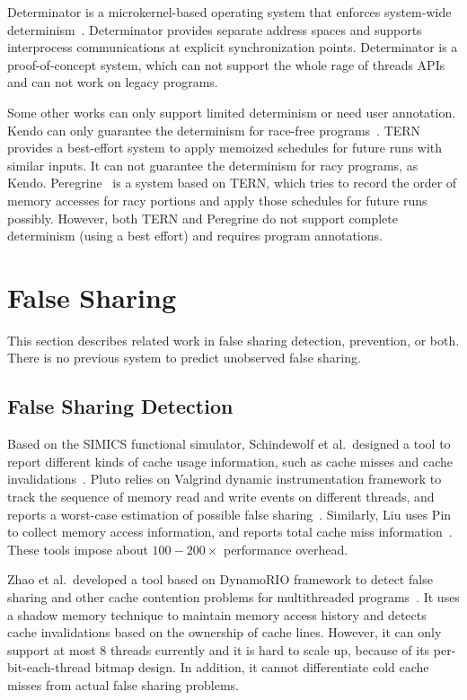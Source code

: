 Determinator is a microkernel-based operating system that enforces system-wide determinism~\cite{efficient-system-enforced}. Determinator provides separate address spaces and supports interprocess
communications at explicit synchronization points. 
Determinator is a proof-of-concept system, which can not support the whole rage of
threads APIs and can not work on legacy programs.  

Some other works can only support limited determinism or need user annotation.
Kendo can only guarantee the determinism for race-free programs~\cite{1508256}. 
TERN~\cite{stable-deterministic} provides a best-effort system to apply memoized schedules for future runs with similar inputs. 
It can not guarantee the determinism for racy programs, as Kendo. 
Peregrine~\cite{peregrine:sosp11} is a system based on TERN, which tries to record the order of memory accesses for racy portions and apply those schedules for future runs possibly.
However, both TERN and Peregrine do not support complete determinism (using a best effort) and requires program annotations. 

\section{False Sharing}

This section describes related work in false sharing detection, prevention, or both. There is no previous
system to predict unobserved false sharing.

\subsection{False Sharing Detection}
Based on the SIMICS functional simulator, Schindewolf et al.\ designed a tool to report different kinds of cache usage information, such as cache misses and cache invalidations~\cite{falseshare:simulator}. Pluto relies on Valgrind dynamic instrumentation framework to track the sequence of memory read and write events on different threads, and reports a worst-case estimation of possible false sharing~\cite{falseshare:binaryinstrumentation1}.
Similarly, Liu uses Pin to collect memory access information, and reports total cache miss information~\cite{falseshare:binaryinstrumentation2}.
These tools impose about $100-200\times$ performance overhead.

Zhao et al.\ developed a tool based on DynamoRIO framework to detect false sharing and other cache contention problems
for multithreaded programs~\cite{qinzhao}. 
It uses a shadow memory technique to maintain memory access history and detects cache invalidations based on the ownership of cache lines. However, it can only support at most $8$ threads currently and it is hard to scale up, because of its per-bit-each-thread bitmap design. In addition, it cannot differentiate cold cache misses from actual false sharing problems.

